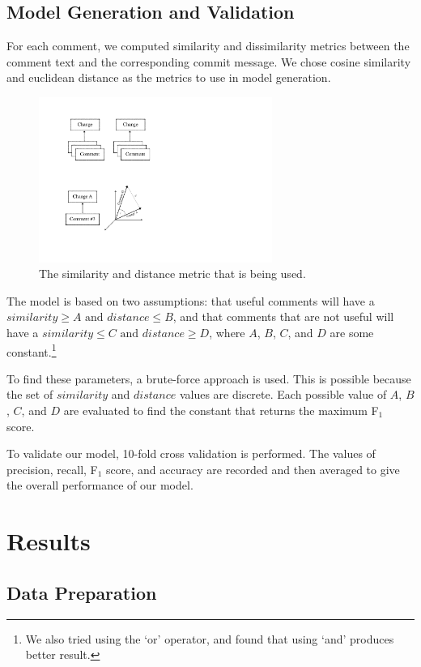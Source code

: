 \documentclass[conference]{IEEEtran}
\begin{document}
\subsection{Model Generation and Validation}

For each comment, we computed similarity and dissimilarity metrics
between the comment text and the corresponding commit message.
We chose cosine similarity and euclidean distance as the metrics to use in model generation.

\begin{figure}[h]
\centering
\includegraphics[width=3in]{vector}
\caption{The similarity and distance metric that is being used.}
\label{fig:vector}
\end{figure}

The model is based on two assumptions: that useful comments will have a $similarity \geq A \text{ and } distance \leq B$,
and that comments that are not useful will have a $ similarity \leq C \text{ and } distance \geq D$,
where $A$, $B$, $C$, and $D$ are some constant.\footnote{We also tried using the `or' operator, and found that using `and' produces better result.}

To find these parameters, a brute-force approach is used.
This is possible because the set of $similarity$ and $distance$ values are discrete.
Each possible value of $A$, $B$, $C$, and $D$ are evaluated to find the constant that returns the maximum F$_1$ score.

To validate our model, 10-fold cross validation is performed.
The values of precision, recall, F$_1$ score, and accuracy are recorded and then averaged
to give the overall performance of our model.


\section{Results}

\subsection{Data Preparation}
\end{document}
